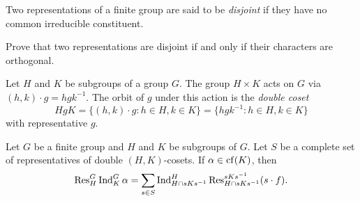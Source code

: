 \begin{definition}
    Two representations of a finite group 
    are said to be \emph{disjoint} if they have no common 
    irreducible constituent. 
\end{definition}

\begin{exercise}
\label{xca:disjoint}
    Prove that 
    two representations are disjoint if and only if their characters are orthogonal. 
\end{exercise}

Let $H$ and $K$ be subgroups of a group $G$. 
The group $H\times K$ acts on $G$ via $(h,k)\cdot g=hgk^{-1}$. 
The orbit of $g$ under this action is 
the \emph{double coset} 
\[
HgK=\{(h,k)\cdot g:h\in H,k\in K\}
=\{hgk^{-1}:h\in H,k\in K\}
\]
with representative $g$. 

\begin{theorem}[Mackey]
\label{thm:Mackey}
    Let $G$ be a finite group and $H$ and $K$ be 
    subgroups of $G$. Let $S$ be a complete set 
    of representatives of double $(H,K)$-cosets. If $\alpha\in\operatorname{cf}(K)$, then 
    \[
    \operatorname{Res}_H^G\operatorname{Ind}_K^G\alpha=\sum_{s\in S}\operatorname{Ind}_{H\cap sKs^{-1}}^H\operatorname{Res}_{H\cap sKs^{-1}}^{sKs^{-1}}(s\cdot f).
    \]
\end{theorem}

